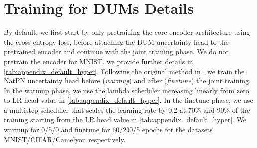 \section{Training for DUMs Details}
\label{subsec:appendix_training}

By default, we first start by only pretraining the core encoder architecture using the cross-entropy loss, before attaching the DUM uncertainty head to the pretrained encoder and continue with the joint training phase. We do not pretrain the encoder for MNIST. we provide further details in \cref{tab:appendix_default_hyper}.
Following the original method in \cite{NatPN2021}, we train the NatPN uncertainty head before (\textit{warmup}) and after (\textit{finetune}) the joint training. In the warmup phase, we use the lambda scheduler increasing linearly from zero to LR head value in \cref{tab:appendix_default_hyper}. In the finetune phase, we use a multistep scheduler that scales the learning rate by 0.2 at 70\% and 90\% of the training starting from the LR head value in \cref{tab:appendix_default_hyper}. We warmup for 0/5/0 and finetune for 60/200/5 epochs for the datasets MNIST/CIFAR/Camelyon respectively.


